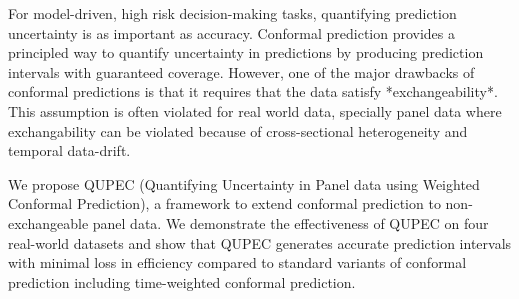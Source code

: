 For model-driven, high risk decision-making tasks, quantifying prediction  uncertainty is as important as accuracy. Conformal prediction provides a principled way to quantify uncertainty in predictions by producing prediction intervals with guaranteed coverage. However, one of the major drawbacks of conformal predictions is that it requires that the data satisfy *exchangeability*. This assumption is often violated for real world data, specially panel data where exchangability can be violated because of cross-sectional heterogeneity and temporal data-drift.

We propose QUPEC (Quantifying Uncertainty in Panel data using Weighted Conformal Prediction), a framework to extend conformal prediction to non-exchangeable panel data. We demonstrate the effectiveness of QUPEC on four real-world datasets and show that QUPEC generates accurate prediction intervals with minimal loss in efficiency compared to standard variants of conformal prediction including time-weighted conformal prediction.
